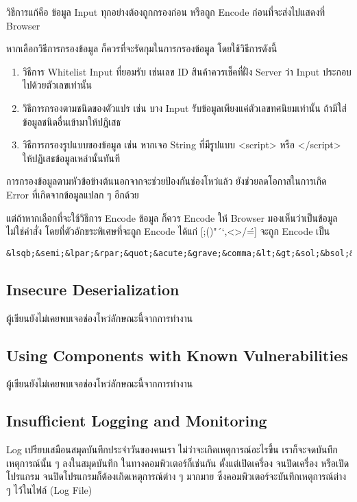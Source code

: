 วิธีการแก้คือ ข้อมูล Input ทุกอย่างต้องถูกกรองก่อน หรือถูก Encode ก่อนที่จะส่งไปแสดงที่ Browser

หากเลือกวิธีการกรองข้อมูล ก็ควรที่จะรัดกุมในการกรองข้อมูล โดยใช้วิธีการดังนี้

\begin{enumerate}
	\itemsep0em 
	\item วิธีการ Whitelist Input ที่ยอมรับ เช่นเลข ID สินค้าควรเช็คที่ฝั่ง Server ว่า Input ประกอบไปด้วยตัวเลขเท่านั้น
	\item วิธีการกรองตามชนิดของตัวแปร เช่น บาง Input รับข้อมูลเพียงแค่ตัวเลขทศนิยมเท่านั้น ถ้ามีใส่ข้อมูลชนิดอื่นเข้ามาให้ปฏิเสธ
	\item วิธีการกรองรูปแบบของข้อมูล เช่น หากเจอ String ที่มีรูปแบบ <script> หรือ </script> ให้ปฏิเสธข้อมูลเหล่านั้นทันที
\end{enumerate}

การกรองข้อมูลตามหัวข้อข้างต้นนอกจากจะช่วยป้องกันช่องโหว่แล้ว ยังช่วยลดโอกาสในการเกิด Error ที่เกิดจากข้อมูลแปลก ๆ อีกด้วย

แต่ถ้าหากเลือกที่จะใช้วิธีการ Encode ข้อมูล ก็ควร Encode ให้ Browser มองเห็นว่าเป็นข้อมูลไม่ใช่คำสั่ง โดยที่ตัวอักขระพิเศษที่จะถูก Encode ได้แก่ [;()"´`,<>/\'=] จะถูก Encode เป็น

 \begin{lstlisting}[numbers=none]
&lsqb;&semi;&lpar;&rpar;&quot;&acute;&grave;&comma;&lt;&gt;&sol;&bsol;&apos;&equals;&rsqb;
\end{lstlisting}

\subsection{Insecure Deserialization}
ผู้เขียนยังไม่เคยพบเจอช่องโหว่ลักษณะนี้จากการทำงาน
\subsection{Using Components with Known Vulnerabilities}
ผู้เขียนยังไม่เคยพบเจอช่องโหว่ลักษณะนี้จากการทำงาน
\subsection{Insufficient Logging and Monitoring}

Log เปรียบเสมือนสมุดบันทึกประจำวันของคนเรา ไม่ว่าจะเกิดเหตุการณ์อะไรขึ้น เราก็จะจดบันทึกเหตุการณ์นั้น ๆ ลงในสมุดบันทึก ในทางคอมพิวเตอร์ก็เช่นกัน ตั้งแต่เปิดเครื่อง จนปิดเครื่อง หรือเปิดโปรแกรม จนปิดโปรแกรมก็ต้องเกิดเหตุการณ์ต่าง ๆ มากมาย ซึ่งคอมพิวเตอร์จะบันทึกเหตุการณ์ต่าง ๆ ไว้ในไฟล์ (Log File)

